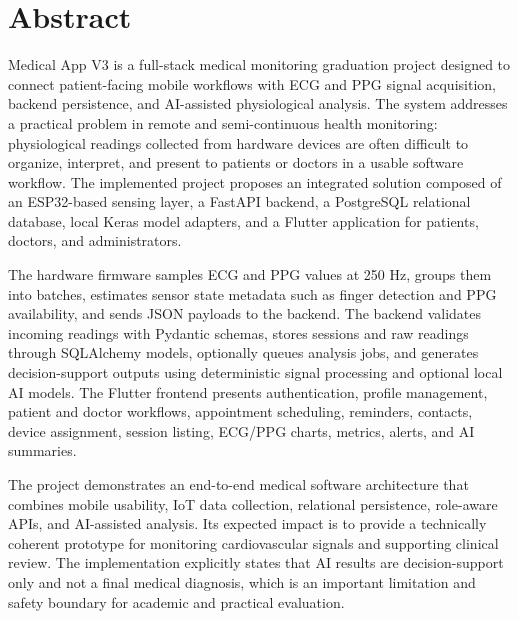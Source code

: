 \chapter{Abstract}

Medical App V3 is a full-stack medical monitoring graduation project designed to connect patient-facing mobile workflows with ECG and PPG signal acquisition, backend persistence, and AI-assisted physiological analysis. The system addresses a practical problem in remote and semi-continuous health monitoring: physiological readings collected from hardware devices are often difficult to organize, interpret, and present to patients or doctors in a usable software workflow. The implemented project proposes an integrated solution composed of an ESP32-based sensing layer, a FastAPI backend, a PostgreSQL relational database, local Keras model adapters, and a Flutter application for patients, doctors, and administrators.

The hardware firmware samples ECG and PPG values at 250 Hz, groups them into batches, estimates sensor state metadata such as finger detection and PPG availability, and sends JSON payloads to the backend. The backend validates incoming readings with Pydantic schemas, stores sessions and raw readings through SQLAlchemy models, optionally queues analysis jobs, and generates decision-support outputs using deterministic signal processing and optional local AI models. The Flutter frontend presents authentication, profile management, patient and doctor workflows, appointment scheduling, reminders, contacts, device assignment, session listing, ECG/PPG charts, metrics, alerts, and AI summaries.

The project demonstrates an end-to-end medical software architecture that combines mobile usability, IoT data collection, relational persistence, role-aware APIs, and AI-assisted analysis. Its expected impact is to provide a technically coherent prototype for monitoring cardiovascular signals and supporting clinical review. The implementation explicitly states that AI results are decision-support only and not a final medical diagnosis, which is an important limitation and safety boundary for academic and practical evaluation.
